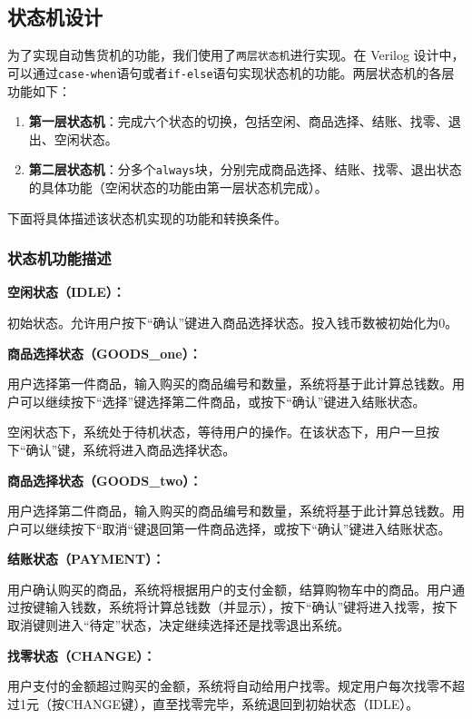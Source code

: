 \documentclass[12pt]{SEU-Circuit-Report}
\begin{document}
    \subsection{状态机设计}
    为了实现自动售货机的功能，我们使用了\texttt{两层状态机}进行实现。在 Verilog 设计中，可以通过\texttt{case-when}语句或者\texttt{if-else}语句实现状态机的功能。两层状态机的各层功能如下：
    \begin{enumerate}
        \item \textbf{第一层状态机}：完成六个状态的切换，包括空闲、商品选择、结账、找零、退出、空闲状态。
        \item \textbf{第二层状态机}：分多个\texttt{always}块，分别完成商品选择、结账、找零、退出状态的具体功能（空闲状态的功能由第一层状态机完成）。
    \end{enumerate}

    下面将具体描述该状态机实现的功能和转换条件。

    \subsubsection{状态机功能描述}
    \textbf{空闲状态（IDLE）：}

    初始状态。允许用户按下“确认”键进入商品选择状态。投入钱币数被初始化为0。


    \textbf{商品选择状态（GOODS\_one）：}

    用户选择第一件商品，输入购买的商品编号和数量，系统将基于此计算总钱数。用户可以继续按下“选择”键选择第二件商品，或按下“确认”键进入结账状态。
    
    空闲状态下，系统处于待机状态，等待用户的操作。在该状态下，用户一旦按下“确认”键，系统将进入商品选择状态。
    
    \textbf{商品选择状态（GOODS\_two）：}

    用户选择第二件商品，输入购买的商品编号和数量，系统将基于此计算总钱数。用户可以继续按下“取消“键退回第一件商品选择，或按下“确认”键进入结账状态。

    \textbf{结账状态（PAYMENT）：}

    用户确认购买的商品，系统将根据用户的支付金额，结算购物车中的商品。用户通过按键输入钱数，系统将计算总钱数（并显示），按下“确认”键将进入找零，按下取消键则进入“待定”状态，决定继续选择还是找零退出系统。

    \textbf{找零状态（CHANGE）：}

    用户支付的金额超过购买的金额，系统将自动给用户找零。规定用户每次找零不超过1元（按CHANGE键），直至找零完毕，系统退回到初始状态（IDLE）。
\end{document}
